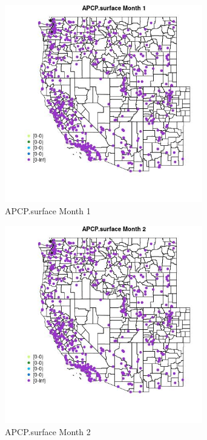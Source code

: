 \begin{figure} 
\centering  
\includegraphics[width=0.77\textwidth]{Code_Outputs/Report_ML_input_PM25_Step4_part_e_de_duplicated_aves_compiled_2019-05-14wNAs_MapObsMo1APCPsurface.jpg} 
\caption{\label{fig:Report_ML_input_PM25_Step4_part_e_de_duplicated_aves_compiled_2019-05-14wNAsMapObsMo1APCPsurface}APCP.surface Month 1} 
\end{figure} 
 

\begin{figure} 
\centering  
\includegraphics[width=0.77\textwidth]{Code_Outputs/Report_ML_input_PM25_Step4_part_e_de_duplicated_aves_compiled_2019-05-14wNAs_MapObsMo2APCPsurface.jpg} 
\caption{\label{fig:Report_ML_input_PM25_Step4_part_e_de_duplicated_aves_compiled_2019-05-14wNAsMapObsMo2APCPsurface}APCP.surface Month 2} 
\end{figure} 
 

